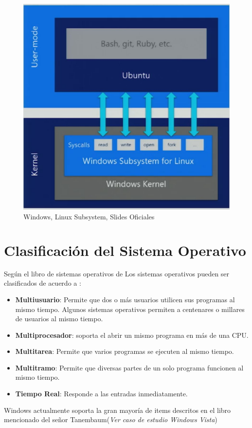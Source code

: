 \documentclass[paper=a4, fontsize=12pt]{article} 		%
\numberwithin{equation}{section}						%
\numberwithin{table}{section} 							%
\begin{document}
\begin{figure}[H]
 \centering
\includegraphics[scale=0.45]{img/ubuntu.png}
\caption{Windows, Linux Subsystem, Slides Oficiales}
\label{fig:dis5}
\end{figure}
\section{Clasificación del Sistema Operativo}
Según el libro de sistemas operativos de Los sistemas operativos pueden ser clasificados de acuerdo a :
\begin{itemize}
\item\textbf{Multiusuario}: Permite que dos o más usuarios utilicen sus programas al mismo tiempo. Algunos sistemas operativos permiten a centenares o millares de usuarios al mismo tiempo.
\item\textbf{Multiprocesador}: soporta el abrir un mismo programa en más de una CPU.
\item\textbf{Multitarea}: Permite que varios programas se ejecuten al mismo tiempo.
\item\textbf{Multitramo}: Permite que diversas partes de un solo programa funcionen al mismo tiempo.
\item\textbf{Tiempo Real}: Responde a las entradas inmediatamente. 
\end{itemize}
Windows actualmente soporta la gran mayoría de items descritos en el libro mencionado del señor Tanembaum(\textit{Ver caso de estudio Windows Vista})
\end{document}
